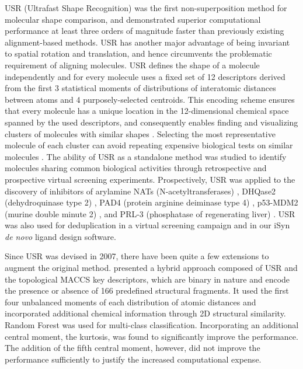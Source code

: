 \documentclass[a4,center,fleqn]{NAR}
\begin{document}
USR (Ultrafast Shape Recognition) \cite{1379} was the first non-superposition method for molecular shape comparison, and demonstrated superior computational performance at least three orders of magnitude faster than previously existing alignment-based methods. USR has another major advantage of being invariant to spatial rotation and translation, and hence circumvents the problematic requirement of aligning molecules. USR defines the shape of a molecule independently and for every molecule uses a fixed set of 12 descriptors derived from the first 3 statistical moments of distributions of interatomic distances between atoms and 4 purposely-selected centroids. This encoding scheme ensures that every molecule has a unique location in the 12-dimensional chemical space spanned by the used descriptors, and consequently enables finding and visualizing clusters of molecules with similar shapes \cite{1280,1332}. Selecting the most representative molecule of each cluster can avoid repeating expensive biological tests on similar molecules \cite{1280}. The ability of USR as a standalone method was studied to identify molecules sharing common biological activities through retrospective \cite{1332} and prospective \cite{1380,1281,1504,1502,1615} virtual screening experiments. Prospectively, USR was applied to the discovery of inhibitors of arylamine NATs (N-acetyltransferases) \cite{1380}, DHQase2 (dehydroquinase type 2) \cite{1281}, PAD4 (protein arginine deiminase type 4) \cite{1504}, p53-MDM2 (murine double minute 2) \cite{1502}, and PRL-3 (phosphatase of regenerating liver) \cite{1615}. USR was also used for deduplication in a virtual screening campaign \cite{1390} and in our iSyn \cite{1409,1387} \textit{de novo} ligand design software.

Since USR was devised in 2007, there have been quite a few extensions \cite{1333,1436,1437,1334,1335,1337,1338,1331,1407,1408,1675} to augment the original method. \cite{1333} presented a hybrid approach composed of USR and the topological MACCS key descriptors, which are binary in nature and encode the presence or absence of 166 predefined structural fragments. It used the first four unbalanced moments of each distribution of atomic distances and incorporated additional chemical information through 2D structural similarity. Random Forest \cite{1309} was used for multi-class classification. Incorporating an additional central moment, the kurtosis, was found to significantly improve the performance. The addition of the fifth central moment, however, did not improve the performance sufficiently to justify the increased computational expense.
\end{document}
